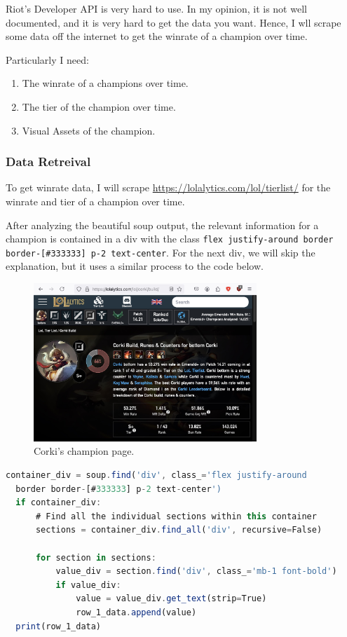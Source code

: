 \documentclass{article}
\begin{document}
Riot's Developer API is very hard to use. In my opinion, it is not well documented, and it is very hard to get the data you want.
Hence, I wll scrape some data off the internet to get the winrate of a champion over time.

Particularly I need:
\begin{enumerate}
  \item The winrate of a champions over time.
  \item The tier of the champion over time.
  \item Visual Assets of the champion.
\end{enumerate}

\subsubsection{Data Retreival} 
\label{subsubsec:Data Retreival}

To get winrate data, I will scrape \url{https://lolalytics.com/lol/tierlist/} for the winrate and tier of a champion over time.

After analyzing the beautiful soup output, the relevant information for a champion 
is contained in a div with the class \texttt{flex justify-around border border-[\#333333] p-2 text-center}.
For the next div, we will skip the explanation, but it uses a similar process to the code below.

\begin{figure}[ht] %
  \centering
  \includegraphics[width=0.75\textwidth]{figs/website.jpg}
  \caption{
      Corki's champion page.
  }
  \label{fig:fig1}
\end{figure}

\begin{lstlisting}[language=Javascript]
  container_div = soup.find('div', class_='flex justify-around 
  border border-[#333333] p-2 text-center')
  if container_div:
      # Find all the individual sections within this container
      sections = container_div.find_all('div', recursive=False)
      
      for section in sections:
          value_div = section.find('div', class_='mb-1 font-bold')
          if value_div:
              value = value_div.get_text(strip=True)
              row_1_data.append(value)
  print(row_1_data)
\end{lstlisting}
\end{document}
